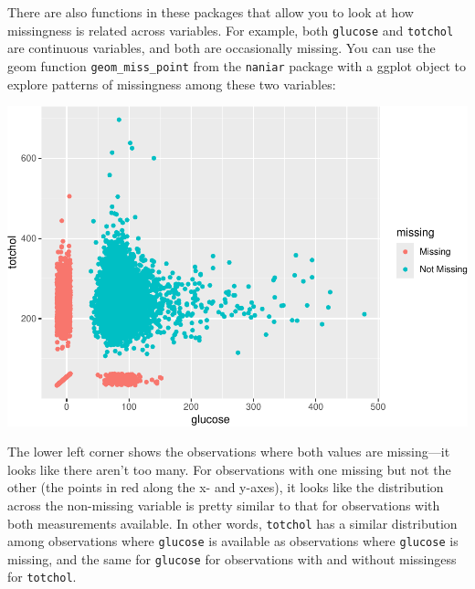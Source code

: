 \documentclass[
]{book}
\newenvironment{Shaded}{\begin{snugshade}}{\end{snugshade}}
\newcommand{\DataTypeTok}[1]{\textcolor[rgb]{0.13,0.29,0.53}{#1}}
\newcommand{\KeywordTok}[1]{\textcolor[rgb]{0.13,0.29,0.53}{\textbf{#1}}}
\newcommand{\NormalTok}[1]{#1}
\newcommand{\OperatorTok}[1]{\textcolor[rgb]{0.81,0.36,0.00}{\textbf{#1}}}
\newcommand{\StringTok}[1]{\textcolor[rgb]{0.31,0.60,0.02}{#1}}
\begin{document}
There are also functions in these packages that allow you to look at how
missingness is related across variables. For example, both \texttt{glucose} and
\texttt{totchol} are continuous variables, and both are occasionally missing. You
can use the geom function \texttt{geom\_miss\_point} from the \texttt{naniar} package
with a ggplot object to explore patterns of missingness among these two
variables:

\begin{Shaded}
\end{Shaded}

\includegraphics{adv_epi_analysis_files/figure-latex/unnamed-chunk-177-1.pdf}

The lower left corner shows the observations where both values are missing---it
looks like there aren't too many. For observations with one missing but not the
other (the points in red along the x- and y-axes), it looks like the distribution
across the non-missing variable is pretty similar to that for observations
with both measurements available. In other words, \texttt{totchol} has a similar
distribution among observations where \texttt{glucose} is available as observations
where \texttt{glucose} is missing, and the same for \texttt{glucose} for observations with and without missingess for \texttt{totchol}.
\end{document}
